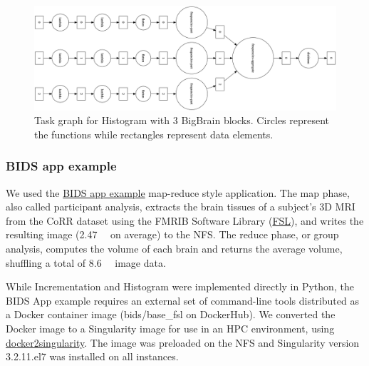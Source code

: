 \documentclass[conference]{IEEEtran}
\begin{document}
\begin{figure}[!t]
    \centering
    \includegraphics[height=\columnwidth,
    angle=-90]{images/histogram-task-graph.png}
    \caption{Task graph for Histogram with 3 BigBrain blocks. Circles represent the
    functions while rectangles represent data elements.
    }\label{fig:tg-histo}
\end{figure}

\subsubsection{BIDS app example}

We used the
\href{https://github.com/BIDS-Apps/example}{BIDS app example} map-reduce style 
application. The map phase, also called participant analysis, extracts the brain
tissues of a subject's 3D MRI from the CoRR dataset using the FMRIB Software Library
(\href{https://fsl.fmrib.ox.ac.uk/fsl/fslwiki}{FSL}), and writes the resulting
image (\SI{2.47}{\mega\byte} on average) to the NFS. The reduce phase, or group
analysis, computes the volume of each brain and returns the average
volume, shuffling a total of \SI{8.6}{\giga\byte} image data.

While Incrementation and Histogram were implemented directly in Python, the 
BIDS App example requires an external set of command-line tools distributed as a Docker container image
(bids/base\_fsl on DockerHub). We converted the Docker image to a Singularity image for use in 
an HPC environment, using
\href{https://hub.docker.com/r/singularityware/docker2singularity/tags/}{docker2singularity}.
The image was preloaded on the NFS and Singularity version 3.2.1\-1.el7 was installed
on all instances.
\end{document}
